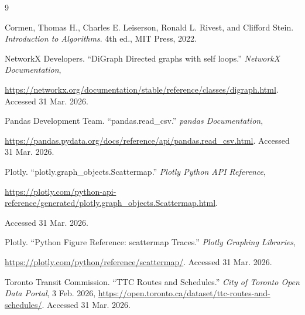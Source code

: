 \documentclass[fontsize=11pt]{article}
\begin{document}
\begin{thebibliography}{9}

    Cormen, Thomas H., Charles E. Leiserson, Ronald L. Rivest, and Clifford Stein.
    \textit{Introduction to Algorithms}. 4th ed., MIT Press, 2022.

    NetworkX Developers.
    ``DiGraph Directed graphs with self loops.''
    \textit{NetworkX Documentation},
    
    \url{https://networkx.org/documentation/stable/reference/classes/digraph.html}.
    Accessed 31 Mar. 2026.

    Pandas Development Team.
    ``pandas.read\_csv.''
    \textit{pandas Documentation},
    
    \url{https://pandas.pydata.org/docs/reference/api/pandas.read_csv.html}.
    Accessed 31 Mar. 2026.

    Plotly.
    ``plotly.graph\_objects.Scattermap.''
    \textit{Plotly Python API Reference},
    
    \url{https://plotly.com/python-api-reference/generated/plotly.graph_objects.Scattermap.html}.
    
    Accessed 31 Mar. 2026.

    Plotly.
    ``Python Figure Reference: scattermap Traces.''
    \textit{Plotly Graphing Libraries},
    
    \url{https://plotly.com/python/reference/scattermap/}.
    Accessed 31 Mar. 2026.

    Toronto Transit Commission.
    ``TTC Routes and Schedules.''
    \textit{City of Toronto Open Data Portal}, 3 Feb. 2026,
    \url{https://open.toronto.ca/dataset/ttc-routes-and-schedules/}.
    Accessed 31 Mar. 2026.

\end{thebibliography}
\end{document}
